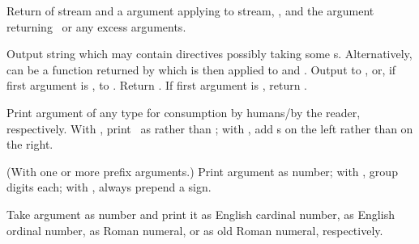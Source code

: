 \begin{LIST}{1cm}

  {
    Return  of stream and a  argument applying  to
    stream, , and the  argument
    returning \NIL\ or any excess arguments. 
  }

  {
    Output string  which may
    contain \kwd{\TLD} directives possibly taking some
    s. Alternatively,  can be a function returned
    by  which is then applied to  and .
    Output to ,  or, if first
    argument is \T, to . Return \retval{\NIL}. If
    first argument is \NIL, return . 
  }

  \begin{LIST}{.5cm}

    {%
      Print argument of any type for consumption by humans/by the
      reader, respectively. With \kwd{:}, print \NIL\ as \LIT{()} rather
      than ; with , add s on the left
      rather than on the right.
    }
    
    {%
      (With one or more prefix arguments.) Print argument as number; with
      \KWD{:}, group digits  each; with ,
      always prepend a sign. 
    }

    {
      Take argument as number and print it as English cardinal number,
      as English ordinal number, as Roman numeral, or as old Roman
      numeral, respectively.
    }


\end{LIST}
\end{LIST}
